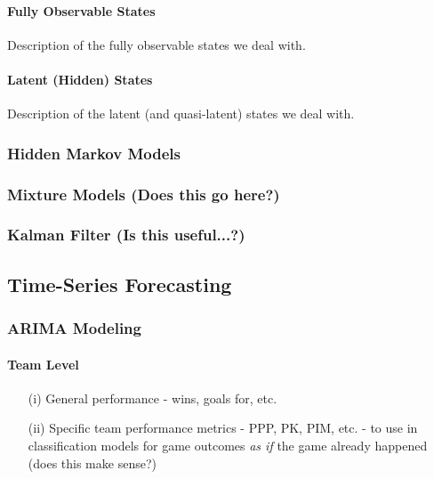 \documentclass{notes}
\begin{document}
          \paragraph{Fully Observable States}
            Description of the fully observable states we deal with.

          \paragraph{Latent (Hidden) States}
            Description of the latent (and quasi-latent) states we deal with.


        \subsubsection{Hidden Markov Models}


        \subsubsection{Mixture Models (Does this go here?)}


        \subsubsection{Kalman Filter (Is this useful...?)}



    \subsection{Time-Series Forecasting}

      \subsubsection{ARIMA Modeling}

        \paragraph{Team Level}

          \begin{itemize}
            \item[(i)] General performance - wins, goals for, etc.

            \item[(ii)] Specific team performance metrics - PPP, PK, PIM, etc. - to use in classification models for game outcomes \emph{as if} the game already happened (does this make sense?)

          \end{itemize}
\end{document}
